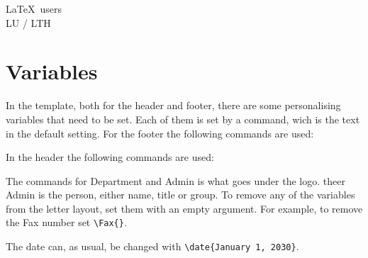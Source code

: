 \documentclass[11pt,eng,LTH,logoBW]{ulundletter}
\begin{document}
\begin{letter}{\LaTeX\ users\\ LU / LTH}
  \section{Variables}
  In the template, both for the header and footer, there are some personalising variables that need to be set. Each of them is set by a command, wich is the text in the default setting. For the footer the following commands are used:
  \begin{CodeBox}{}
  \end{CodeBox}
  \noindent In the header the following commands are used:
  \begin{CodeBox}{}
  \end{CodeBox}
  The commands for Department and Admin is what goes under the logo. theer Admin is the person, either name, title or group. To remove any of the variables from the letter layout, set them with an empty argument. For example, to remove the Fax number set \verb|\Fax{}|. 

  The date can, as usual, be changed with \verb|\date{January 1, 2030}|.


\end{letter}
\end{document}
